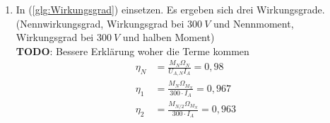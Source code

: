 \begin{solution}
\begin{enumerate}
\item In (\ref{glg:Wirkungsgrad}) einsetzen. Es ergeben sich drei Wirkungsgrade. (Nennwirkungsgrad, Wirkungsgrad bei $300~V$ und Nennmoment, Wirkungsgrad bei $300~V$ und halben Moment)\\
\textbf{TODO}: Bessere Erklärung woher die Terme kommen
\begin{align}
\eta_N &= \frac{M_N \Omega_N}{U_{A,N} I_A} = 0,98\\
\eta_1 &= \frac{M_N \Omega_{M_N}}{300 \cdot I_A} = 0,967\\
\eta_2 &= \frac{M_{N/2} \Omega_{M_N}}{300 \cdot I_A} = 0,963
\end{align}
\end{enumerate}
\end{solution}